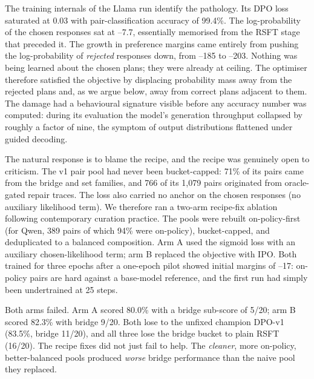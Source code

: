 The training internals of the Llama run identify the pathology. Its DPO loss saturated at 0.03 with pair-classification accuracy of 99.4\%. The log-probability of the chosen responses sat at --7.7, essentially memorised from the RSFT stage that preceded it. The growth in preference margins came entirely from pushing the log-probability of \emph{rejected} responses down, from --185 to --203. Nothing was being learned about the chosen plans; they were already at ceiling. The optimiser therefore satisfied the objective by displacing probability mass away from the rejected plans and, as we argue below, away from correct plans adjacent to them. The damage had a behavioural signature visible before any accuracy number was computed: during its evaluation the model's generation throughput collapsed by roughly a factor of nine, the symptom of output distributions flattened under guided decoding.

The natural response is to blame the recipe, and the recipe was genuinely open to criticism. The v1 pair pool had never been bucket-capped: 71\% of its pairs came from the bridge and set families, and 766 of its 1,079 pairs originated from oracle-gated repair traces. The loss also carried no anchor on the chosen responses (no auxiliary likelihood term). We therefore ran a two-arm recipe-fix ablation following contemporary curation practice. The pools were rebuilt on-policy-first (for Qwen, 389 pairs of which 94\% were on-policy), bucket-capped, and deduplicated to a balanced composition. Arm A used the sigmoid loss with an auxiliary chosen-likelihood term; arm B replaced the objective with IPO. Both trained for three epochs after a one-epoch pilot showed initial margins of --17: on-policy pairs are hard against a base-model reference, and the first run had simply been undertrained at 25 steps.

Both arms failed. Arm A scored 80.0\% with a bridge sub-score of 5/20; arm B scored 82.3\% with bridge 9/20. Both lose to the unfixed champion DPO-v1 (83.5\%, bridge 11/20), and all three lose the bridge bucket to plain RSFT (16/20). The recipe fixes did not just fail to help. The \emph{cleaner}, more on-policy, better-balanced pools produced \emph{worse} bridge performance than the naive pool they replaced.

